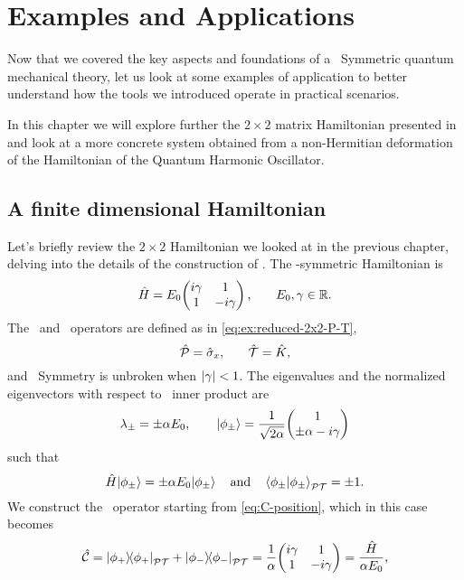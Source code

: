 \chapter{Examples and Applications}\label{ch:examples}
    Now that we covered the key aspects and foundations of a \PT\ Symmetric quantum mechanical theory, let us look at some examples of application to better understand how the tools we introduced operate in practical scenarios.
    
    In this chapter we will explore further the $2\times2$ matrix Hamiltonian presented in  and look at a more concrete system obtained from a non-Hermitian deformation of the Hamiltonian of the Quantum Harmonic Oscillator.
    \section{A finite dimensional Hamiltonian}
        Let's briefly review the $2\times2$ Hamiltonian we looked at in the previous chapter, delving into the details of the construction of \hC. The \PT-symmetric Hamiltonian is
        \begin{equation}
            \hH = E_0\! \pmqty{\dmat[1]{i\gamma, -i\gamma}}
            \mycomma \qquad
            E_0,\gamma \in \bbR
            \myperiod
        \end{equation}
        The \hP\ and \hT\ operators are defined as in \eqref{eq:ex:reduced-2x2-P-T},
        \begin{equation*}
            \mathcal{\hat{P}} = \hat{\sigma}_x \text{,} \qquad \mathcal{\hat{T}} = \hat{K}
            \text{,}
        \end{equation*}
        and \PT\ Symmetry is unbroken when $\abs{\gamma} < 1$. The eigenvalues and the normalized eigenvectors with respect to \PT\ inner product are
        \begin{equation*}
            \lambda_\pm = \pm \alpha E_0
            \mycomma
            \qquad
            \ket{\phi_\pm} = \frac{1}{\sqrt{2\alpha}} \!\pmqty{1 \\ \pm\alpha - i \gamma}
        \end{equation*}
        such that
        \begin{equation*}
            \hH \!\ket{\phi_\pm} = \pm \alpha E_0 \!\ket{\phi_\pm}
            \qand
            \braket{\phi_\pm}{\phi_\pm}_{\PT} = \pm 1
            \myperiod
        \end{equation*}
        We construct the \hC\ operator starting from \eqref{eq:C-position}, which in this case becomes
        \begin{equation}
            \hC = \dyad{\phi_+}{\phi_{+}}_{\PT} + \dyad{\phi_-}{\phi_-}_{\PT}
            = \frac{1}{\alpha} \!\pmqty{\dmat[1]{i\gamma, -i\gamma}}
            = \frac{\hH}{\alpha E_0}
            \mycomma
        \end{equation}
